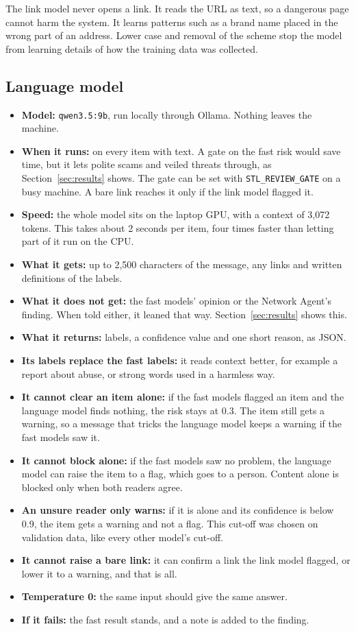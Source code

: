 \documentclass[11pt,a4paper]{article}
\newcommand{\code}[1]{\texttt{#1}}
\begin{document}
The link model never opens a link. It reads the URL as text, so a dangerous page cannot harm the system. It learns patterns such as a brand name placed in the wrong part of an address. Lower case and removal of the scheme stop the model from learning details of how the training data was collected.

\subsection*{Language model}

\begin{itemize}
  \item \textbf{Model:} \code{qwen3.5:9b}, run locally through Ollama. Nothing leaves the machine.
  \item \textbf{When it runs:} on every item with text. A gate on the fast risk would save time, but it lets polite scams and veiled threats through, as Section~\ref{sec:results} shows. The gate can be set with \code{STL\_REVIEW\_GATE} on a busy machine. A bare link reaches it only if the link model flagged it.
  \item \textbf{Speed:} the whole model sits on the laptop GPU, with a context of 3,072 tokens. This takes about 2 seconds per item, four times faster than letting part of it run on the CPU.
  \item \textbf{What it gets:} up to 2,500 characters of the message, any links and written definitions of the labels.
  \item \textbf{What it does not get:} the fast models' opinion or the Network Agent's finding. When told either, it leaned that way. Section~\ref{sec:results} shows this.
  \item \textbf{What it returns:} labels, a confidence value and one short reason, as JSON.
  \item \textbf{Its labels replace the fast labels:} it reads context better, for example a report about abuse, or strong words used in a harmless way.
  \item \textbf{It cannot clear an item alone:} if the fast models flagged an item and the language model finds nothing, the risk stays at 0.3. The item still gets a warning, so a message that tricks the language model keeps a warning if the fast models saw it.
  \item \textbf{It cannot block alone:} if the fast models saw no problem, the language model can raise the item to a flag, which goes to a person. Content alone is blocked only when both readers agree.
  \item \textbf{An unsure reader only warns:} if it is alone and its confidence is below 0.9, the item gets a warning and not a flag. This cut-off was chosen on validation data, like every other model's cut-off.
  \item \textbf{It cannot raise a bare link:} it can confirm a link the link model flagged, or lower it to a warning, and that is all.
  \item \textbf{Temperature 0:} the same input should give the same answer.
  \item \textbf{If it fails:} the fast result stands, and a note is added to the finding.
\end{itemize}
\end{document}
